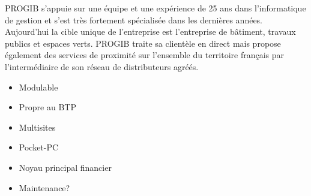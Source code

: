 {
PROGIB s'appuie sur une équipe et une expérience de 25 ans dans l'informatique de gestion et s'est très fortement spécialisée dans les dernières années.
Aujourd'hui la cible unique de l'entreprise est l'entreprise de bâtiment, travaux publics et espaces verts.
PROGIB traite sa clientèle en direct mais propose également des services de proximité sur l'ensemble du territoire
français par l'intermédiaire de son réseau de distributeurs agréés.
}
{
    \begin{itemize}
        \item Modulable
        \item Propre au BTP
        \item Multisites
        \item Pocket-PC
    \end{itemize}
}
{
    \begin{itemize}
        \item Noyau principal financier
        \item Maintenance?
    \end{itemize}
}

